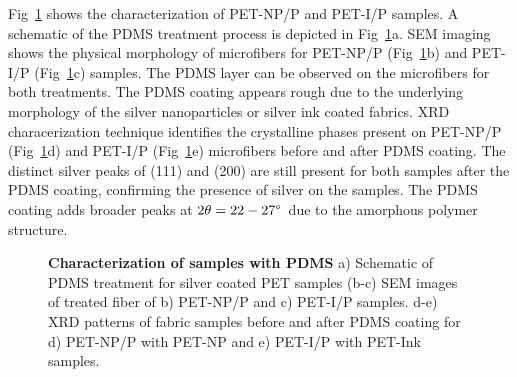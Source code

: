 \documentclass[10pt,letterpaper]{article}
\begin{document}
Fig~\ref{fig3} shows the characterization of PET-NP/P and PET-I/P samples. A schematic of the  PDMS treatment process is depicted in Fig~\ref{fig3}a.
SEM imaging shows the physical morphology of microfibers for PET-NP/P (Fig~\ref{fig3}b) and PET-I/P (Fig~\ref{fig3}c) samples. The PDMS layer can be observed on the microfibers for both treatments. The PDMS coating appears rough due to the underlying morphology of the silver nanoparticles or silver ink coated fabrics.
XRD characerization technique identifies the crystalline phases present on PET-NP/P (Fig~\ref{fig3}d) and PET-I/P (Fig~\ref{fig3}e) microfibers before and after PDMS coating. The distinct silver peaks of (111) and (200) are still present for both samples after the PDMS coating, confirming the presence of silver on the samples. The PDMS coating adds broader peaks at $2\theta = 22-27\degree$~due to the amorphous polymer structure. 

\begin{figure}[!h]
\caption{{\bf Characterization of samples with PDMS}{
a) Schematic of PDMS treatment for silver coated PET samples (b-c) SEM images of treated fiber of b) PET-NP/P and c) PET-I/P samples. d-e) XRD patterns of fabric samples before and after PDMS coating for d) PET-NP/P with PET-NP and e) PET-I/P with PET-Ink samples.}}
\label{fig3}
\end{figure}

\end{document}
